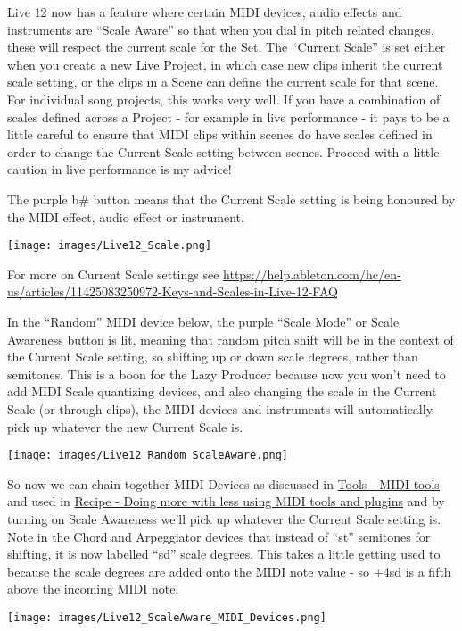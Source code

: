 \documentclass[
  12pt,
  letterpaper,
  oneside,
  open=any]{scrbook}
\begin{document}
Live 12 now has a feature where certain MIDI devices, audio effects and
instruments are ``Scale Aware'' so that when you dial in pitch related
changes, these will respect the current scale for the Set. The ``Current
Scale'' is set either when you create a new Live Project, in which case
new clips inherit the current scale setting, or the clips in a Scene can
define the current scale for that scene. For individual song projects,
this works very well. If you have a combination of scales defined across
a Project - for example in live performance - it pays to be a little
careful to ensure that MIDI clips within scenes do have scales defined
in order to change the Current Scale setting between scenes. Proceed
with a little caution in live performance is my advice!

The purple b\# button means that the Current Scale setting is being
honoured by the MIDI effect, audio effect or instrument.

\texttt{[image: images/Live12\_Scale.png]}

For more on Current Scale settings see
\url{https://help.ableton.com/hc/en-us/articles/11425083250972-Keys-and-Scales-in-Live-12-FAQ}

In the ``Random'' MIDI device below, the purple ``Scale Mode'' or Scale
Awareness button is lit, meaning that random pitch shift will be in the
context of the Current Scale setting, so shifting up or down scale
degrees, rather than semitones. This is a boon for the Lazy Producer
because now you won't need to add MIDI Scale quantizing devices, and
also changing the scale in the Current Scale (or through clips), the
MIDI devices and instruments will automatically pick up whatever the new
Current Scale is.

\texttt{[image: images/Live12\_Random\_ScaleAware.png]}

So now we can chain together MIDI Devices as discussed in
\hyperref[Chapter-004-Tools-MIDI_tools]{Tools - MIDI tools} and used in
\hyperref[Chapter-006-Recipe-MIDI_tools]{Recipe - Doing more with less
using MIDI tools and plugins} and by turning on Scale Awareness we'll
pick up whatever the Current Scale setting is. Note in the Chord and
Arpeggiator devices that instead of ``st'' semitones for shifting, it is
now labelled ``sd'' scale degrees. This takes a little getting used to
because the scale degrees are added onto the MIDI note value - so +4sd
is a fifth above the incoming MIDI note.

\texttt{[image: images/Live12\_ScaleAware\_MIDI\_Devices.png]}
\end{document}
